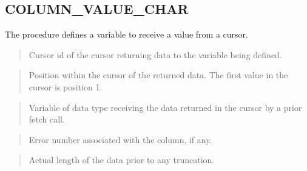 \documentclass[letterpaper,10pt,english,openany,oneside]{sphinxmanual}
\begin{document}
\newpage


\subsection{COLUMN\_VALUE\_CHAR}
\label{\detokenize{column_value_char:column-value-char}}\label{\detokenize{column_value_char::doc}}
The  procedure defines a variable to receive a 
value from a cursor.

\begin{quote}

\end{quote}


\begin{quote}

Cursor id of the cursor returning data to the variable being defined.
\end{quote}

\begin{quote}

Position within the cursor of the returned data. The first value in the
cursor is position 1.
\end{quote}

\begin{quote}

Variable of data type  receiving the data returned in the cursor by
a prior fetch call.
\end{quote}

\begin{quote}

Error number associated with the column, if any.
\end{quote}

\begin{quote}

Actual length of the data prior to any truncation.
\end{quote}
\end{document}
